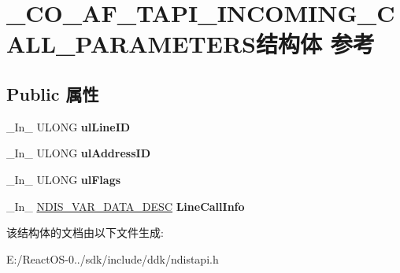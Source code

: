 \hypertarget{struct___c_o___a_f___t_a_p_i___i_n_c_o_m_i_n_g___c_a_l_l___p_a_r_a_m_e_t_e_r_s}{}\section{\+\_\+\+C\+O\+\_\+\+A\+F\+\_\+\+T\+A\+P\+I\+\_\+\+I\+N\+C\+O\+M\+I\+N\+G\+\_\+\+C\+A\+L\+L\+\_\+\+P\+A\+R\+A\+M\+E\+T\+E\+R\+S结构体 参考}
\label{struct___c_o___a_f___t_a_p_i___i_n_c_o_m_i_n_g___c_a_l_l___p_a_r_a_m_e_t_e_r_s}
\subsection*{Public 属性}
\begin{DoxyCompactItemize}
\item 
\mbox{\label{struct___c_o___a_f___t_a_p_i___i_n_c_o_m_i_n_g___c_a_l_l___p_a_r_a_m_e_t_e_r_s_aba1a2c4696675d8c2c4c11d8ba0da733}} 
\+\_\+\+In\+\_\+ U\+L\+O\+NG {\bfseries ul\+Line\+ID}
\item 
\mbox{\label{struct___c_o___a_f___t_a_p_i___i_n_c_o_m_i_n_g___c_a_l_l___p_a_r_a_m_e_t_e_r_s_a6c3eb910e7010ef43267d0fce907398f}} 
\+\_\+\+In\+\_\+ U\+L\+O\+NG {\bfseries ul\+Address\+ID}
\item 
\mbox{\label{struct___c_o___a_f___t_a_p_i___i_n_c_o_m_i_n_g___c_a_l_l___p_a_r_a_m_e_t_e_r_s_a0e36594508110e9f9e9d229a78564092}} 
\+\_\+\+In\+\_\+ U\+L\+O\+NG {\bfseries ul\+Flags}
\item 
\mbox{\label{struct___c_o___a_f___t_a_p_i___i_n_c_o_m_i_n_g___c_a_l_l___p_a_r_a_m_e_t_e_r_s_a99e881ba4e033026b8f9081dc8b5e3c7}} 
\+\_\+\+In\+\_\+ \hyperlink{struct___n_d_i_s___v_a_r___d_a_t_a___d_e_s_c}{N\+D\+I\+S\+\_\+\+V\+A\+R\+\_\+\+D\+A\+T\+A\+\_\+\+D\+E\+SC} {\bfseries Line\+Call\+Info}
\end{DoxyCompactItemize}


该结构体的文档由以下文件生成\+:\begin{DoxyCompactItemize}
\item 
E\+:/\+React\+O\+S-\/0../sdk/include/ddk/ndistapi.\+h\end{DoxyCompactItemize}
